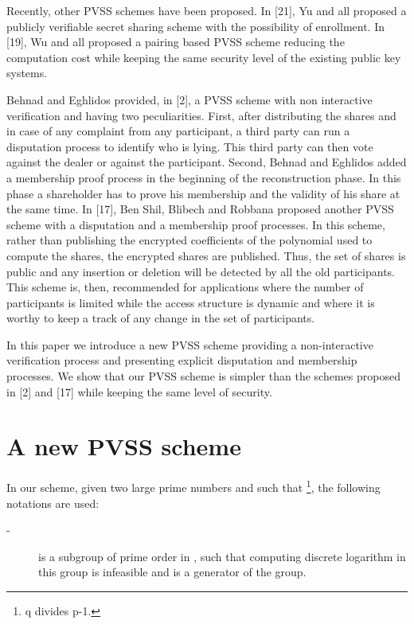 \documentclass[submission,copyright,creativecommons]{eptcs}
\begin{document}
Recently, other PVSS schemes have been proposed. In [21], Yu and all proposed
a publicly verifiable secret sharing scheme with the possibility of
enrollment. In [19], Wu and all proposed a pairing based PVSS scheme reducing
the computation cost while keeping the same security level of the existing
public key systems.

Behnad and Eghlidos provided, in [2], a PVSS scheme with non interactive
verification and having two peculiarities. First, after distributing the
shares and in case of any complaint from any participant, a third party can
run a disputation process to identify who is lying. This third party can
then vote against the dealer or against the participant. Second, Behnad and
Eghlidos added a membership proof process in the beginning of the
reconstruction phase. In this phase a shareholder has to prove his
membership and the validity of his share at the same time. In [17], Ben
Shil, Blibech and Robbana proposed another PVSS scheme with a disputation
and a membership proof processes. In this scheme, rather than publishing the
encrypted coefficients of the polynomial used to compute the shares, the
encrypted shares are published. Thus, the set of shares is public and any
insertion or deletion will be detected by all the old participants. This
scheme is, then, recommended for applications where the number of
participants is limited while the access structure is dynamic and where it
is worthy to keep a track of any change in the set of participants.

In this paper we introduce a new PVSS scheme providing a non-interactive
verification process and presenting explicit disputation and membership
processes. We show that our PVSS scheme is simpler than the schemes proposed
in [2] and [17] while keeping the same level of security.

\section{A new PVSS scheme}

In our scheme, given two large prime numbers  and  such that \footnote{q divides p-1.}, the following notations are used:

\begin{description}
\item[-]  is a subgroup of prime order  in , such
that computing discrete logarithm in this group is infeasible and   
 is a generator of the group.
\end{description}
\end{document}

